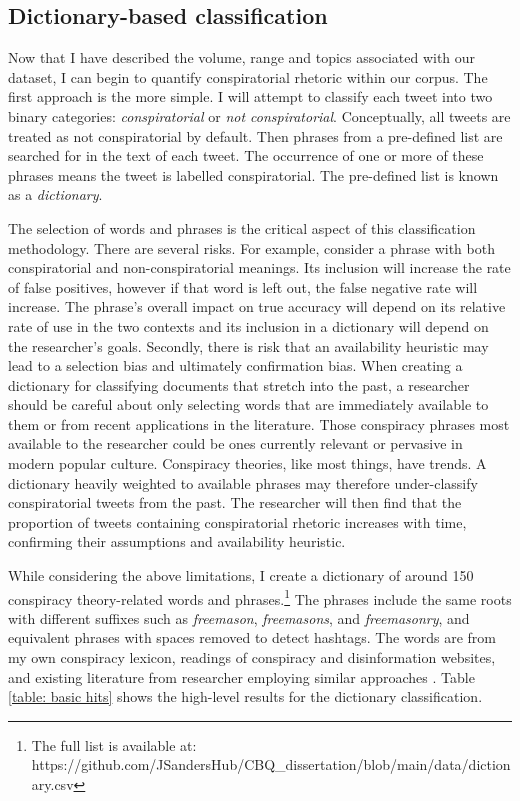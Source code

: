 \documentclass[11pt]{article}
\begin{document}
\subsection{Dictionary-based classification} \label{Subsection: Dictionary-based classification}

Now that I have described the volume, range and topics associated with our dataset, I can begin to quantify conspiratorial rhetoric within our corpus. The first approach is the more simple. I will attempt to classify each tweet into two binary categories: \textit{conspiratorial} or \textit{not conspiratorial}. Conceptually, all tweets are treated as not conspiratorial by default. Then phrases from a pre-defined list are searched for in the text of each tweet. The occurrence of one or more of these phrases means the tweet is labelled conspiratorial. The pre-defined list is known as a \textit{dictionary}.

The selection of words and phrases is the critical aspect of this classification methodology. There are several risks. For example, consider a phrase with both conspiratorial and non-conspiratorial meanings. Its inclusion will increase the rate of false positives, however if that word is left out, the false negative rate will increase. The phrase's overall impact on true accuracy will depend on its relative rate of use in the two contexts and its inclusion in a dictionary will depend on the researcher's goals. Secondly, there is risk that an availability heuristic may lead to a selection bias and ultimately confirmation bias. When creating a dictionary for classifying documents that stretch into the past, a researcher should be careful about only selecting words that are immediately available to them or from recent applications in the literature. Those conspiracy phrases most available to the researcher could be ones currently relevant or pervasive in modern popular culture. Conspiracy theories, like most things, have trends. A dictionary heavily weighted to available phrases may therefore under-classify conspiratorial tweets from the past. The researcher will then find that the proportion of tweets containing conspiratorial rhetoric increases with time, confirming their assumptions and availability heuristic.

While considering the above limitations, I create a dictionary of around 150 conspiracy theory-related words and phrases.\footnote{The full list is available at: https://github.com/JSandersHub/CBQ\_dissertation/blob/main/data/dictionary.csv} The phrases include the same roots with different suffixes such as \textit{freemason}, \textit{freemasons}, and \textit{freemasonry}, and equivalent phrases with spaces removed to detect hashtags. The words are from my own conspiracy lexicon, readings of conspiracy and disinformation websites, and existing literature from researcher employing similar approaches \citep{mahl2021nasa, jackson2021qanon}. Table \ref{table: basic hits} shows the high-level results for the dictionary classification.
\end{document}
